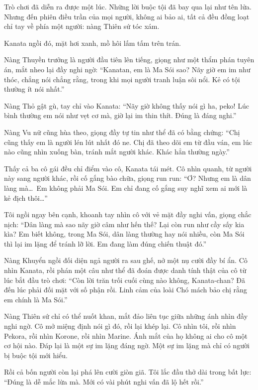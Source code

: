 \documentclass[../main.tex]{subfiles}
\begin{document}
Trò chơi đã diễn ra được một lúc. Những lời buộc tội đã bay qua lại như tên lửa. Nhưng đến phiên điều trần của mọi người, không ai bảo ai, tất cả đều đồng loạt chỉ tay về phía một người: nàng Thiên sứ tóc xám.

Kanata ngồi đó, mặt hơi xanh, mồ hôi lấm tấm trên trán.

Nàng Thuyền trưởng là người đầu tiên lên tiếng, giọng như một thẩm phán tuyên án, mắt nheo lại đầy nghi ngờ: ``Kanatan, em là Ma Sói sao? Nãy giờ em im như thóc, chẳng nói chẳng rằng, trong khi mọi người tranh luận sôi nổi. Kẻ có tội thường ít nói nhất.''

Nàng Thỏ gật gù, tay chỉ vào Kanata: ``Nãy giờ không thấy nói gì ha, peko! Lúc bình thường em nói như vẹt cơ mà, giờ lại im thin thít. Đúng là đáng nghi.''

Nàng Vu nữ cũng hùa theo, giọng đầy tự tin như thể đã có bằng chứng: ``Chị cũng thấy em là người lén lút nhất đó ne. Chị đã theo dõi em từ đầu ván, em lúc nào cũng nhìn xuống bàn, tránh mắt người khác. Khác hẳn thường ngày.''


Thấy cả ba cô gái đều chỉ điểm vào cô, Kanata tái mét. Cô nhìn quanh, từ người này sang người khác, rồi cố gắng bào chữa, giọng run run: ``Ơ? Nhưng em là dân làng mà\dots\ Em không phải Ma Sói. Em chỉ đang cố gắng suy nghĩ xem ai mới là kẻ địch thôi\dots''

Tôi ngồi ngay bên cạnh, khoanh tay nhìn cô với vẻ mặt đầy nghi vấn, giọng chắc nịch: ``Dân làng mà sao nãy giờ câm như hến thế? Lại còn run như cầy sấy kia kìa? Em biết không, trong Ma Sói, dân làng thường hay nói nhiều, còn Ma Sói thì lại im lặng để tránh lỡ lời. Em đang làm đúng chiến thuật đó.''

Nàng Khuyển ngồi đối diện ngả người ra sau ghế, nở một nụ cười đầy bí ẩn. Cô nhìn Kanata, rồi phán một câu như thể đã đoán được danh tính thật của cô từ lúc bắt đầu trò chơi: ``Còn lời trăn trối cuối cùng nào không, Kanata-chan? Đã đến lúc phải đối mặt với số phận rồi. Linh cảm của loài Chó mách bảo chị rằng em chính là Ma Sói.''

Nàng Thiên sứ chỉ có thể nuốt khan, mắt đảo liên tục giữa những ánh nhìn đầy nghi ngờ. Cô mở miệng định nói gì đó, rồi lại khép lại. Cô nhìn tôi, rồi nhìn Pekora, rồi nhìn Korone, rồi nhìn Marine. Ánh mắt của họ không ai cho cô một cơ hội nào. Đáp lại là một sự im lặng đáng ngờ. Một sự im lặng mà chỉ có người bị buộc tội mới hiểu.

Rồi cả bốn người còn lại phá lên cười giòn giã. Tôi lắc đầu thở dài trong bất lực: ``Đúng là dễ mắc lừa mà. Mới có vài phút nghi vấn đã lộ hết rồi.''
\end{document}
